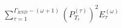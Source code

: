 \documentclass[preview]{standalone}
\begin{document}
\begin{align*}
\sum_{\tau=1}^{\Gamma_{RND}-(\omega+1)}(P_{T_r}^{(\tau)})^2E_{\tau}^{(\omega)}
\end{align*}
\end{document}
